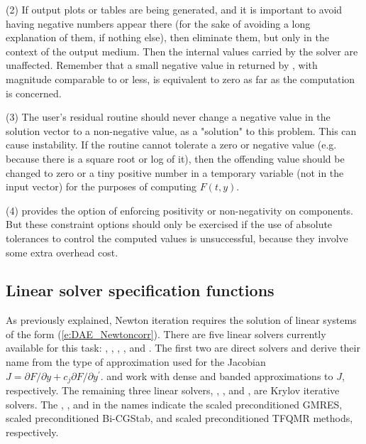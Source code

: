 (2) If output plots or tables are being generated, and it is important
to avoid having negative numbers appear there (for the sake of avoiding
a long explanation of them, if nothing else), then eliminate them, but
only in the context of the output medium.  Then the internal values carried
by the solver are unaffected.  Remember that a small negative value in 
returned by {\ida}, with magnitude comparable to  or less,
is equivalent to zero as far as the computation is concerned.

(3) The user's residual routine  should never change a
negative value in the solution vector  to a non-negative value,
as a "solution" to this problem.  This can cause instability.  If the
 routine cannot tolerate a zero or negative value (e.g. because
there is a square root or log of it), then the offending value should
be changed to zero or a tiny positive number in a temporary variable
(not in the input  vector) for the purposes of computing $F(t,y)$.

(4) {\ida} provides the option of enforcing positivity or non-negativity
on components.  But these constraint options should only be exercised if
the use of absolute tolerances to control the computed values is
unsuccessful, because they involve some extra overhead cost.


\subsection{Linear solver specification functions}\label{sss:lin_solv_init}

As previously explained, Newton iteration requires the solution of
linear systems of the form (\ref{e:DAE_Newtoncorr}).  There are five {\ida} linear
solvers currently available for this task: {\idadense}, {\idaband}, {\idaspgmr},
{\idaspbcg}, and {\idasptfqmr}.  The first two are direct solvers and derive their
name from the type of approximation used for the Jacobian 
$J = \partial{F}/\partial{y} + c_j \partial{F}/\partial{y^\prime}$.
{\idadense} and {\idaband} work with dense and banded approximations to $J$,
respectively.  The remaining three {\ida} linear solvers, {\idaspgmr}, {\idaspbcg},
and {\idasptfqmr}, are Krylov iterative solvers. The {\spgmr}, {\spbcg}, and
{\sptfqmr} in the names indicate the scaled preconditioned GMRES, scaled
preconditioned Bi-CGStab, and scaled preconditioned TFQMR methods, respectively.

